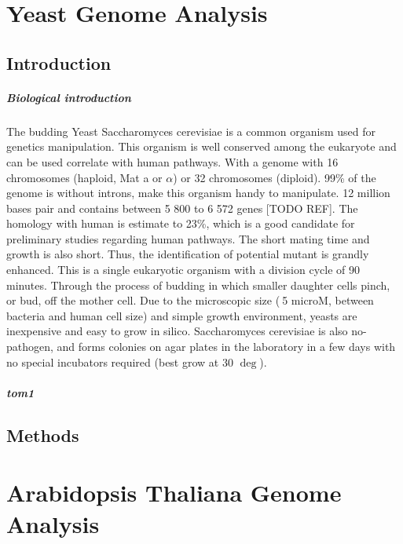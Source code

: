 \documentclass[10pt,a4paper]{report}
\begin{document}
\chapter*{Yeast Genome Analysis}

\section*{Introduction}

\paragraph{Biological introduction}The budding Yeast Saccharomyces cerevisiae is a common organism used for genetics manipulation. This organism is well conserved among the eukaryote and can be used correlate with human pathways. With a genome with 16 chromosomes (haploid, Mat a or $ \alpha $) or 32 chromosomes (diploid). 99\% of the genome is without introns, make this organism handy to manipulate. 12 million bases pair and contains between 5 800 to 6 572 genes [TODO REF]. The homology with human is estimate to 23\%, which is a good candidate for preliminary studies regarding human pathways. The short mating time and growth is also short. Thus, the identification of potential mutant is grandly enhanced. This is a single eukaryotic organism with a division cycle of 90 minutes. Through the process of budding in which smaller daughter cells pinch, or bud, off the mother cell. Due to the microscopic size ($~$5 microM, between bacteria and human cell size) and simple growth environment, yeasts are inexpensive and easy to grow in silico. Saccharomyces cerevisiae is also no-pathogen, and forms colonies on agar plates in the laboratory in a few days with no special incubators required (best grow at 30 $ \deg $). 

\paragraph{\textit{tom1}} 

\section*{Methods}



\chapter*{Arabidopsis Thaliana Genome Analysis}
\end{document}
